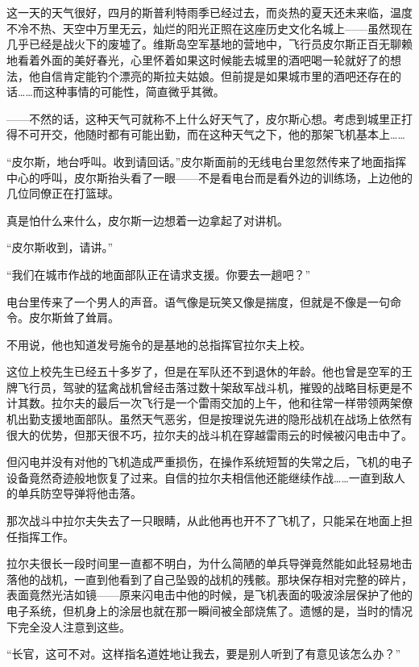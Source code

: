 \section*{}

这一天的天气很好，四月的斯普利特雨季已经过去，而炎热的夏天还未来临，温度不冷不热、天空中万里无云，灿烂的阳光正照在这座历史文化名城上——虽然现在几乎已经是战火下的废墟了。维斯岛空军基地的营地中，飞行员皮尔斯正百无聊赖地看着外面的美好春光，心里怀着如果这时候能去城里的酒吧喝一轮就好了的想法，他自信肯定能钓个漂亮的斯拉夫姑娘。但前提是如果城市里的酒吧还存在的话……而这种事情的可能性，简直微乎其微。

——不然的话，这种天气可就称不上什么好天气了，皮尔斯心想。考虑到城里正打得不可开交，他随时都有可能出勤，而在这种天气之下，他的那架飞机基本上……

“皮尔斯，地台呼叫。收到请回话。”皮尔斯面前的无线电台里忽然传来了地面指挥中心的呼叫，皮尔斯抬头看了一眼——不是看电台而是看外边的训练场，上边他的几位同僚正在打篮球。

真是怕什么来什么，皮尔斯一边想着一边拿起了对讲机。

“皮尔斯收到，请讲。”

“我们在城市作战的地面部队正在请求支援。你要去一趟吧？”

电台里传来了一个男人的声音。语气像是玩笑又像是揣度，但就是不像是一句命令。皮尔斯耸了耸肩。

不用说，他也知道发号施令的是基地的总指挥官拉尔夫上校。

这位上校先生已经五十多岁了，但是在军队还不到退休的年龄。他也曾是空军的王牌飞行员，驾驶的猛禽战机曾经击落过数十架敌军战斗机，摧毁的战略目标更是不计其数。拉尔夫的最后一次飞行是一个雷雨交加的上午，他和往常一样带领两架僚机出勤支援地面部队。虽然天气恶劣，但是按理说先进的隐形战机在战场上依然有很大的优势，但那天很不巧，拉尔夫的战斗机在穿越雷雨云的时候被闪电击中了。

但闪电并没有对他的飞机造成严重损伤，在操作系统短暂的失常之后，飞机的电子设备竟然奇迹般地恢复了过来。自信的拉尔夫相信他还能继续作战……一直到敌人的单兵防空导弹将他击落。

那次战斗中拉尔夫失去了一只眼睛，从此他再也开不了飞机了，只能呆在地面上担任指挥工作。

拉尔夫很长一段时间里一直都不明白，为什么简陋的单兵导弹竟然能如此轻易地击落他的战机，一直到他看到了自己坠毁的战机的残骸。那块保存相对完整的碎片，表面竟然光洁如镜——原来闪电击中他的时候，是飞机表面的吸波涂层保护了他的电子系统，但机身上的涂层也就在那一瞬间被全部烧焦了。遗憾的是，当时的情况下完全没人注意到这些。

“长官，这可不对。这样指名道姓地让我去，要是别人听到了有意见该怎么办？”

